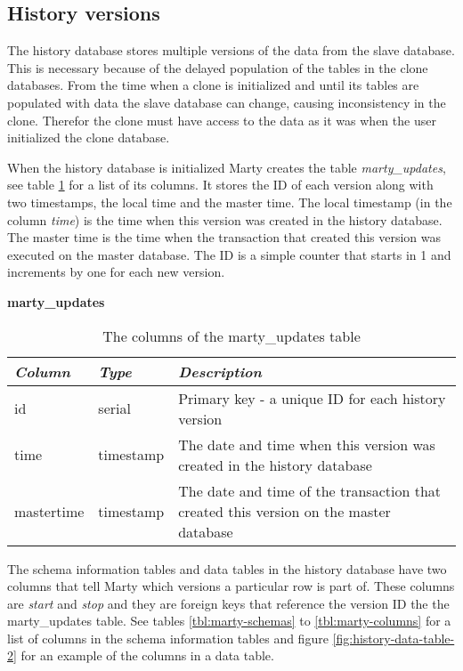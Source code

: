 \subsection{History versions}
\label{ch:implementation-history-versions}
The history database stores multiple versions of the data from the slave database.
This is necessary because of the delayed population of the tables in the clone databases.
From the time when a clone is initialized and until its tables are populated with data the slave database can change, causing inconsistency in the clone.
Therefor the clone must have access to the data as it was when the user initialized the clone database.

When the history database is initialized Marty creates the table \textit{marty\_updates}, see table \ref{tbl:marty-updates} for a list of its columns.
It stores the ID of each version along with two timestamps, the local time and the master time.
The local timestamp (in the column \textit{time}) is the time when this version was created in the history database.
The master time is the time when the transaction that created this version was executed on the master database.
The ID is a simple counter that starts in 1 and increments by one for each new version.

\begin{table}[h]
  \centering
  \textbf{marty\_updates}
  \begin{tabularx}{\textwidth}{llX}
    \textit{Column} & \textit{Type} & \textit{Description} \\
    \midrule
    id & serial & Primary key - a unique ID for each history version \\
    time & timestamp & The date and time when this version was created in the history database \\
    mastertime & timestamp & The date and time of the transaction that created this version on the master database \\
  \end{tabularx}
  \caption{ The columns of the marty\_updates table}
  \label{tbl:marty-updates}
\end{table}

The schema information tables and data tables in the history database have two columns that tell Marty which versions a particular row is part of.
These columns are \textit{start} and \textit{stop} and they are foreign keys that reference the version ID the the marty\_updates table.
See tables \ref{tbl:marty-schemas} to \ref{tbl:marty-columns} for a list of columns in the schema information tables and figure \ref{fig:history-data-table-2} for an example of the columns in a data table.

